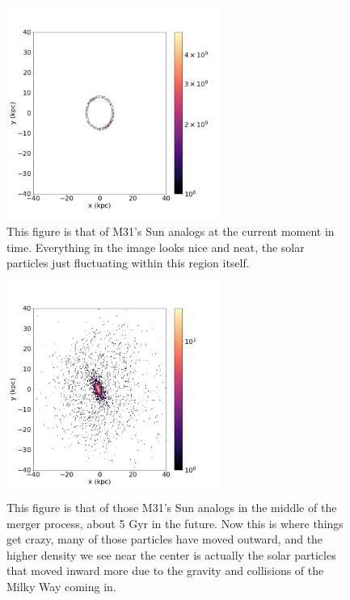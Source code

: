 \documentclass[fleqn,usenatbib]{mnras}
\begin{document}
\begin{figure}
\graphicspath{ {/home/} }
\includegraphics[width=7cm, height=7cm]{FaceOn_Density000}
\caption{This figure is that of M31's Sun analogs at the current moment in time. Everything in the image looks nice and neat, the solar particles just fluctuating within this region itself.
}

\end{figure}

\begin{figure}
\graphicspath{ {/home/} }
\includegraphics[width=7cm, height=7cm]{FaceOn_Density350}
\caption{This figure is that of those M31's Sun analogs in the middle of the merger process, about 5 Gyr in the future. Now this is where things get crazy, many of those particles have moved outward, and the higher density we see near the center is actually the solar particles that moved inward more due to the gravity and collisions of the Milky Way coming in.
}

\end{figure}
\end{document}
